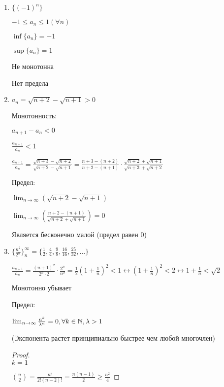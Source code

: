 \begin{enumerate}
    \item
        $\{(-1)^n\}$

        $-1 \leq a_n \leq 1 (\forall n)$

        $\inf\{a_n\} = -1$

        $\sup\{a_n\} = 1$

        Не монотонна

        Нет предела

    \item 
        $a_n = \sqrt{n + 2} - \sqrt{n + 1} > 0$

        Монотонность:

        $a_{n + 1} - a_n < 0$

        $\frac{a_{n + 1}}{a_n} < 1$

        $\frac{a_{n + 1}}{a_n} = \frac{\sqrt{n + 3} - \sqrt{n + 2}}{\sqrt{n + 2} - \sqrt{n + 1}}
        = \frac{n + 3 - (n + 2)}{n + 2 - (n + 1)} \cdot \frac{\sqrt{n + 2} + \sqrt{n + 1}}{\sqrt{n + 3} + \sqrt{n + 2}}$
    
        Предел:

        $\lim_{n \to \infty} (\sqrt{n + 2} - \sqrt{n + 1})$

        $\lim_{n \to \infty} \left(\frac{n + 2 - (n + 1)}{\sqrt{n + 2} + \sqrt{n + 1}}\right) = 0$

        Является бесконечно малой (предел равен 0)

    \item 
        $\{\frac{n^2}{2^n}\}_n^\infty = \{\frac{1}{2}, \frac{4}{4}, \frac{9}{8}, \frac{16}{16}, \frac{25}{32}, \dots\}$

        $\frac{a_{n + 1}}{a_n} = \frac{(n + 1)^2}{2^n \cdot 2} \cdot \frac{2^n}{n^2} = \frac{1}{2}\left( 1 + \frac{1}{n} \right)^2 < 1 
        \leftrightarrow (1 + \frac{1}{n})^2 < 2
        \leftrightarrow 1 + \frac{1}{n} < \sqrt{2}$

        Монотонно убывает

        Предел:

        $\lim_{n \to \infty} \frac{n^k}{\lambda^n} = 0, \forall k \in \mathbb{N}, \lambda > 1$

        (Экспонента растет принципиально быстрее чем любой многочлен)

        \begin{proof}~\\
            $k = 1$

            $\binom{n}{2} = \frac{n!}{2!(n - 2)!} = \frac{n(n - 1)}{2} \geq \frac{n^2}{4}$


\end{proof}
\end{enumerate}
